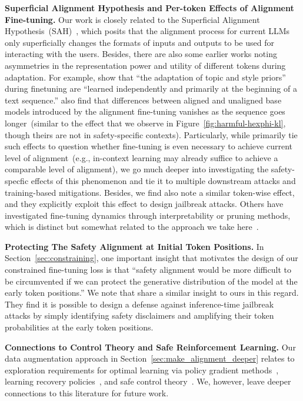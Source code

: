 \textbf{Superficial Alignment Hypothesis and Per-token Effects of Alignment Fine-tuning.} Our work is closely related to the Superficial Alignment Hypothesis~(SAH)~\cite{zhou2023lima}, which posits that the alignment process for current LLMs only superficially changes the formats of inputs and outputs to be used for interacting with the users. %
Besides, there are also some earlier works noting asymmetries in the representation power and utility of different tokens during adaptation. For example, \citet{zhang2024dissecting} show that ``the adaptation of topic and style priors'' during finetuning are ``learned independently and primarily at the beginning of a text sequence.'' \citet{lin2024unlocking} also find that differences between aligned and unaligned base models introduced by the alignment fine-tuning vanishes as the sequence goes longer~(similar to the effect that we observe in Figure~\ref{fig:harmful-hexphi-kl}, though theirs are not in safety-specific contexts). Particularly, while \citet{lin2024unlocking} primarily tie such effects to question whether fine-tuning is even necessary to achieve current level of alignment~(e.g., in-context learning may already suffice to achieve a comparable level of alignment), we go much deeper into investigating the safety-specfic effects of this phenomenon and tie it to multiple downstream attacks and training-based mitigations. Besides, we find \citet{zhao2024weak} also note a similar token-wise effect, and they explicitly exploit this effect to design jailbreak attacks. Others have investigated fine-tuning dynamics through interpretability or pruning methods, which is distinct but somewhat related to the approach we take here~\citep{wei2024assessing,jain2023mechanistically}.

\textbf{Protecting The Safety Alignment at Initial Token Positions.} In Section~\ref{sec:constraining}, one important insight that motivates the design of our constrained fine-tuning loss is that ``safety alignment would be more difficult to be circumvented if we can protect the generative distribution of the model at the early token positions.'' We note that \citet{xu2024safedecoding} share a similar insight to ours in this regard. They find it is possible to design a defense against inference-time jailbreak attacks by simply identifying safety disclaimers and amplifying their token probabilities at the early token positions.

\textbf{Connections to Control Theory and Safe Reinforcement Learning.} Our data augmentation approach in Section~\ref{sec:make_alignment_deeper} relates to exploration requirements for optimal learning via policy gradient methods~\citep{agarwal2021theory}, learning recovery policies~\citep{thananjeyan2021recovery}, and safe control theory~\citep{burridge1999sequential,ames2019control}. We, however, leave deeper connections to this literature for future work.

